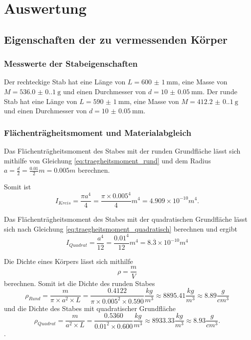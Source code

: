 \section{Auswertung}\label{sec:Auswertung}
\subsection{Eigenschaften der zu vermessenden Körper}
\subsubsection{Messwerte der Stabeigenschaften}
Der rechteckige Stab hat eine Länge von $L=\qty{600(1)}{\milli\meter}$, eine Masse von $M=\qty{536.0(0.1)}{\gram}$
und einen Durchmesser von $d=\qty{10(0.05)}{\milli\meter}$.
Der runde Stab hat eine Länge von $L=\qty{590(1)}{\milli\meter}$, eine Masse von $M=\qty{412.2(0.1)}{\gram}$
und einen Durchmesser von $d=\qty{10(0.05)}{\milli\meter}$.


\subsubsection{Flächenträgheitsmoment und Materialabgleich}

Das Flächenträgheitsmoment des Stabes mit der runden Grundfläche lässt sich mithilfe von Gleichung \eqref{eq:traegheitsmoment_rund} und dem Radius $a=\frac{d}{2}=\frac{0.01}{2}m=0.005m$ berechnen.

\noindent Somit ist
\begin{equation*}
  I_{Kreis}=\frac{\pi a^4}{4}=\frac{\pi\times 0.005^4}{4}m^4=4.909\times 10^{-10}m^4\text{.}
\end{equation*}

\noindent Das Flächenträgheitsmoment des Stabes mit der quadratischen Grundfläche lässt sich nach Gleichung \eqref{eq:traegheitsmoment_quadratisch} berechnen und ergibt
\begin{equation*}
  I_{Quadrat}=\frac{a^4}{12}=\frac{0.01^4}{12}m^4=8.\overline{3}\times 10^{-10}m^4
\end{equation*}

\noindent Die Dichte eines Körpers lässt sich mithilfe
\begin{equation*}
  \rho=\frac{m}{V}
\end{equation*}
berechnen. Somit ist die Dichte des runden Stabes
\begin{equation*}
  \rho_{Rund}=\frac{m}{\pi \times a^2 \times L}=\frac{0.4122}{\pi \times 0.005^2 \times 0.590}\frac{kg}{m^3} \approx 8895.41\frac{kg}{m^3}\approx 8.89\frac{g}{cm^3}
\end{equation*}
und die Dichte des Stabes mit quadratischer Grundfläche
\begin{equation*}
  \rho_{Quadrat}=\frac{m}{a^2 \times L}=\frac{0.5360}{0.01^2 \times 0.600}\frac{kg}{m^3} \approx 8933.33\frac{kg}{m^3} \approx 8.93\frac{g}{cm^3}\text{.}
\end{equation*}.


